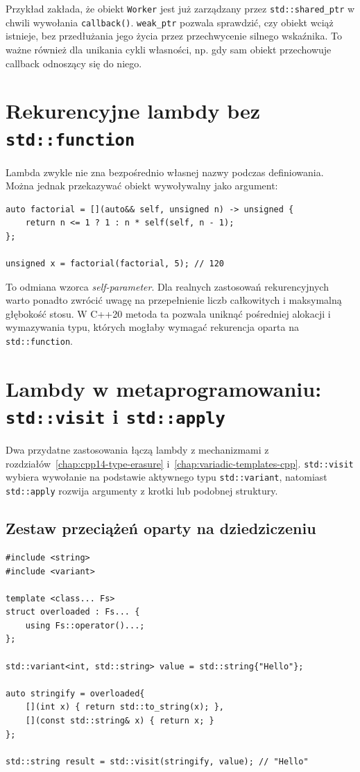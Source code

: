 Przykład zakłada, że obiekt \texttt{Worker} jest już zarządzany przez
\texttt{std::shared\_ptr} w chwili wywołania \texttt{callback()}.
\texttt{weak\_ptr} pozwala sprawdzić, czy obiekt wciąż istnieje,
bez przedłużania jego życia przez przechwycenie silnego wskaźnika.
To ważne również dla unikania cykli własności, np. gdy sam obiekt
przechowuje callback odnoszący się do niego.

\section{Rekurencyjne lambdy bez \texttt{std::function}}

Lambda zwykle nie zna bezpośrednio własnej nazwy podczas definiowania.
Można jednak przekazywać obiekt wywoływalny jako argument:

\begin{lstlisting}
auto factorial = [](auto&& self, unsigned n) -> unsigned {
    return n <= 1 ? 1 : n * self(self, n - 1);
};

unsigned x = factorial(factorial, 5); // 120
\end{lstlisting}

To odmiana wzorca \emph{self-parameter}. Dla realnych zastosowań
rekurencyjnych warto ponadto zwrócić uwagę na przepełnienie liczb
całkowitych i maksymalną głębokość stosu. W C++20 metoda ta pozwala
uniknąć pośredniej alokacji i wymazywania typu, których mogłaby wymagać
rekurencja oparta na \texttt{std::function}.

\section{Lambdy w metaprogramowaniu: \texttt{std::visit} i \texttt{std::apply}}
\label{sec:lambda-visit-apply}

Dwa przydatne zastosowania łączą lambdy z mechanizmami z
rozdziałów~\ref{chap:cpp14-type-erasure} i~\ref{chap:variadic-templates-cpp}.
\texttt{std::visit} wybiera wywołanie na podstawie aktywnego typu
\texttt{std::variant}, natomiast \texttt{std::apply} rozwija argumenty
z krotki lub podobnej struktury.

\subsection{Zestaw przeciążeń oparty na dziedziczeniu}

\begin{lstlisting}
#include <string>
#include <variant>

template <class... Fs>
struct overloaded : Fs... {
    using Fs::operator()...;
};

std::variant<int, std::string> value = std::string{"Hello"};

auto stringify = overloaded{
    [](int x) { return std::to_string(x); },
    [](const std::string& x) { return x; }
};

std::string result = std::visit(stringify, value); // "Hello"
\end{lstlisting}

